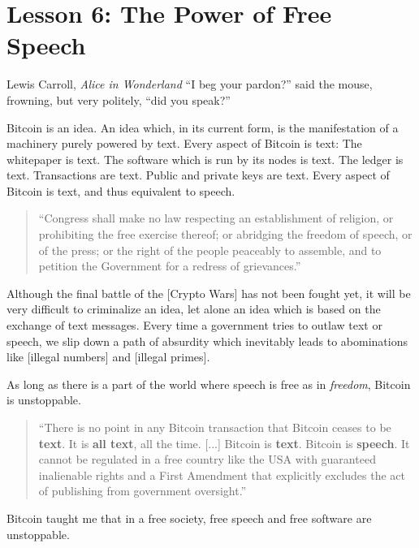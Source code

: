 \chapter{Lesson 6: The Power of Free Speech}
\label{les:6}

\begin{chapquote}{Lewis Carroll, \textit{Alice in Wonderland}}
``I beg your pardon?'' said the mouse, frowning, but very politely, ``did you speak?''
\end{chapquote}

Bitcoin is an idea. An idea which, in its current form, is the
manifestation of a machinery purely powered by text. Every aspect of
Bitcoin is text: The whitepaper is text. The software which is run by
its nodes is text. The ledger is text. Transactions are text. Public and
private keys are text. Every aspect of Bitcoin is text, and thus
equivalent to speech.

\begin{quotation}
``Congress shall make no law respecting an establishment of religion,
or prohibiting the free exercise thereof; or abridging the freedom of
speech, or of the press; or the right of the people peaceably to
assemble, and to petition the Government for a redress of grievances.''
\end{quotation}

Although the final battle of the [Crypto Wars] has not been fought yet,
it will be very difficult to criminalize an idea, let alone an idea
which is based on the exchange of text messages. Every time a government
tries to outlaw text or speech, we slip down a path of absurdity which
inevitably leads to abominations like [illegal numbers] and [illegal
primes].

As long as there is a part of the world where speech is free as in
\textit{freedom}, Bitcoin is unstoppable.

\begin{quotation}
``There is no point in any Bitcoin transaction that Bitcoin ceases to be
\textbf{text}. It is \textbf{all text}, all the time. [...] Bitcoin is
\textbf{text}. Bitcoin is \textbf{speech}. It cannot be regulated in a free
country like the USA with guaranteed inalienable rights and a First Amendment
that explicitly excludes the act of publishing from government oversight.''
\end{quotation}

Bitcoin taught me that in a free society, free speech and free software
are unstoppable.

